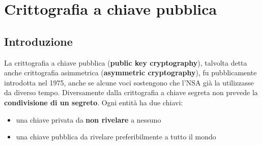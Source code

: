 \chapter{Crittografia a chiave pubblica} \label{ch:publickey}
\section{Introduzione}
La crittografia a chiave pubblica (\textbf{public key cryptography}), talvolta detta anche crittografia asimmetrica (\textbf{asymmetric cryptography}), fu pubblicamente introdotta nel 1975, anche se alcune voci sostengono che l'NSA già la utilizzasse da diverso tempo. Diversamente dalla crittografia a chiave segreta non prevede la \textbf{condivisione di un segreto}. Ogni entità ha due chiavi:

\begin{itemize}
	\item una chiave privata da \textbf{non rivelare} a nessuno
	\item una chiave pubblica da rivelare preferibilmente a tutto il mondo
\end{itemize}

